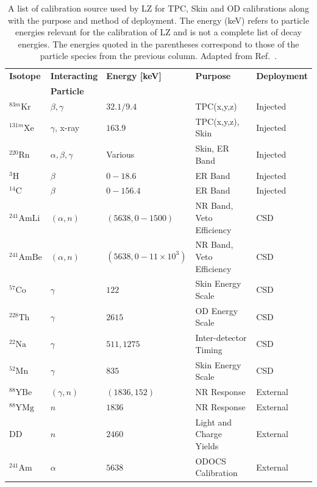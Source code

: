\begin{table}[!ht]
    \centering
    \caption[A list of calibration source used by LZ for TPC, Skin and OD calibrations along with the purpose and method of deployment.]{A list of calibration source used by LZ for TPC, Skin and OD calibrations along with the purpose and method of deployment. The energy (keV) refers to particle energies relevant for the calibration of LZ and is not a complete list of decay energies. The energies quoted in the parentheses correspond to those of the particle species from the previous column. Adapted from Ref.~\cite{LZ:2024bsz,lkorley:thesis}.}
    \begin{tabular}{lllll}
         \hline\hline
         \textbf{Isotope}&\textbf{Interacting}&\textbf{Energy [keV]}&\textbf{Purpose}&\textbf{Deployment}\\
         &\textbf{Particle}& & & \\
         \hline
         $^{83m}\text{Kr}$ & $\beta, \gamma$ & $32.1/9.4$ &TPC(x,y,z) & Injected\\
         $^{131m}\text{Xe}$& $\gamma$, x-ray & $163.9$ & TPC(x,y,z), Skin & Injected\\
         $^{220}\text{Rn}$& $\alpha,\beta,\gamma$ & Various \cite{Jorg:2023nvl} & Skin, ER Band & Injected\\
         $^{3}\text{H}$& $\beta$ & $0-18.6$ &ER Band & Injected\\
         $^{14}\text{C}$& $\beta$ & $0-156.4$ &ER Band & Injected\\
         $^{241}\text{AmLi}$& $(\alpha,n)$ & $(5638, 0-1500)$ & NR Band, Veto Efficiency & CSD\\
         $^{241}\text{AmBe}$& $(\alpha,n)$ & $(5638, 0-11\times10^{3})$ & NR Band, Veto Efficiency & CSD\\
         $^{57}\text{Co}$& $\gamma$ & $122$ &Skin Energy Scale & CSD\\
         $^{228}\text{Th}$& $\gamma$ & $2615$ &OD Energy Scale & CSD\\
         $^{22}\text{Na}$& $\gamma$ & $511, 1275$ &Inter-detector Timing & CSD\\
         $^{52}\text{Mn}$& $\gamma$ & $835$ &Skin Energy Scale & CSD\\
         $^{88}\text{YBe}$& $(\gamma,n)$ & $(1836,152)$ &NR Response & External\\
         $^{88}\text{YMg}$& $n$ & $1836$ & NR Response & External\\
         DD& $n$ & $2460$ & Light and Charge Yields & External\\
         $^{241}\text{Am}$& $\alpha$ & $5638$ &ODOCS Calibration & External\\
         \hline\hline
    \end{tabular}
    \label{tab:LZ/CalibrationSources}
\end{table}
